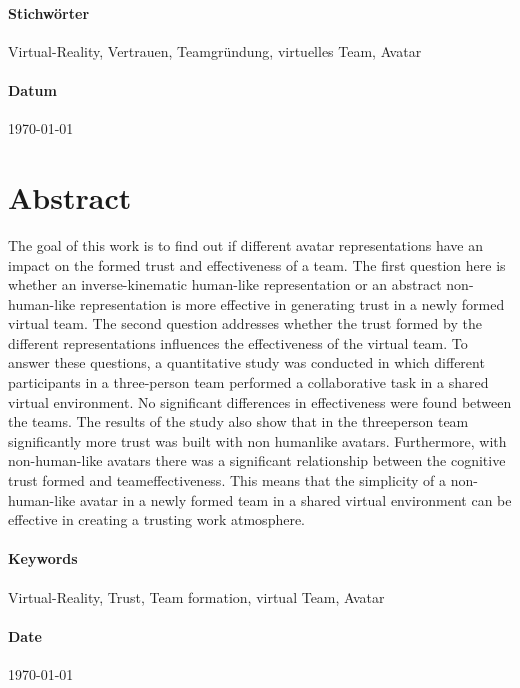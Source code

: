 \documentclass[a4paper,11pt]{article}%
\renewcommand{\\}{\vspace*{0.5\baselineskip} \newline}
\begin{document}
			\paragraph{Stichwörter}
			Virtual-Reality, Vertrauen, Teamgründung, virtuelles Team, Avatar
			
			\paragraph{Datum}
			{\today}
	\newpage
	
\section*{Abstract}
The goal of this work is to find out if different avatar representations have an impact on the formed trust and effectiveness of a team. The first question here is whether an inverse-kinematic human-like representation or an abstract non-human-like representation is more effective in generating trust in a newly formed virtual team. The second question addresses whether the trust formed by the different representations influences the effectiveness of the virtual team. To answer these questions, a quantitative study was conducted in which different participants in a three-person team performed a collaborative task in a shared virtual environment. No significant differences in effectiveness were found between the teams. The results of the study also show that in the threeperson team significantly more trust was built with non humanlike avatars. Furthermore, with non-human-like avatars there was a significant relationship between the cognitive trust formed and teameffectiveness. This means that the simplicity of a non-human-like avatar in a newly formed team in a shared virtual environment can be effective in creating a trusting work atmosphere.

	
			\paragraph{Keywords}
			Virtual-Reality, Trust, Team formation, virtual Team, Avatar
			
			\paragraph{Date}
			{\today}
	\newpage
	\tableofcontents
	\newpage

\listoffigures%
\newpage
\listoftables%
\newpage
	
\end{document}
